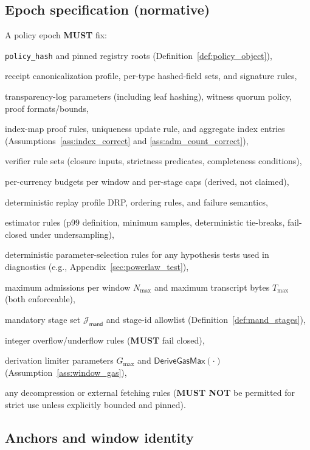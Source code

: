\documentclass[11pt]{article}
\newcommand{\MUST}{\textbf{MUST}}
\newcommand{\MUSTNOT}{\textbf{MUST NOT}}
\newcommand{\code}[1]{\texttt{#1}}
\newcommand{\1}{\mathbf{1}}
\theoremstyle{definition}
\theoremstyle{plain}
\begin{document}
\subsection{Epoch specification (normative)}
A policy epoch \MUST{} fix:
\begin{tightitemize}
\item \code{policy\_hash} and pinned registry roots (Definition~\ref{def:policy_object}),
\item receipt canonicalization profile, per-type hashed-field sets, and signature rules,
\item transparency-log parameters (including leaf hashing), witness quorum policy, proof formats/bounds,
\item index-map proof rules, uniqueness update rule, and aggregate index entries (Assumptions~\ref{ass:index_correct} and \ref{ass:adm_count_correct}),
\item verifier rule sets (closure inputs, strictness predicates, completeness conditions),
\item per-currency budgets per window and per-stage caps (derived, not claimed),
\item deterministic replay profile \textsf{DRP}, ordering rules, and failure semantics,
\item estimator rules (p99 definition, minimum samples, deterministic tie-breaks, fail-closed under undersampling),
\item deterministic parameter-selection rules for any hypothesis tests used in diagnostics (e.g., Appendix~\ref{sec:powerlaw_test}),
\item maximum admissions per window $N_{\max}$ and maximum transcript bytes $T_{\max}$ (both enforceable),
\item mandatory stage set $\mathcal{J}_{\textsf{mand}}$ and stage-id allowlist (Definition~\ref{def:mand_stages}),
\item integer overflow/underflow rules (\MUST{} fail closed),
\item derivation limiter parameters $G_{\max}$ and $\mathsf{DeriveGasMax}(\cdot)$ (Assumption~\ref{ass:window_gas}),
\item any decompression or external fetching rules (\MUSTNOT{} be permitted for strict use unless explicitly bounded and pinned).
\end{tightitemize}

\subsection{Anchors and window identity}
\end{document}
